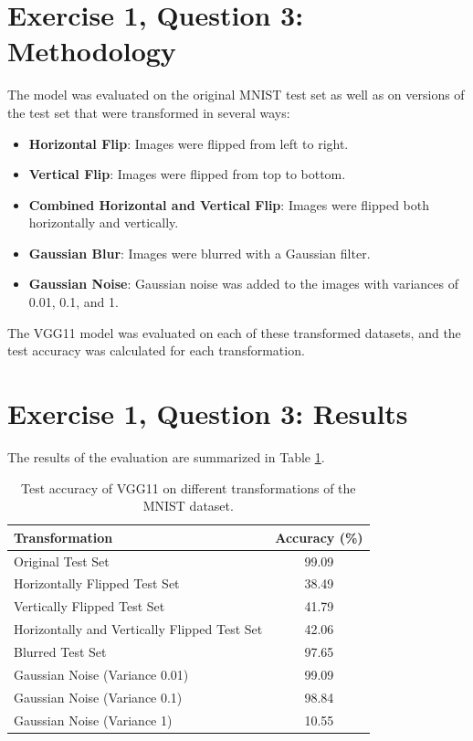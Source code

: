\documentclass[10pt,letter,notitlepage]{article}
\begin{document}
\begin{center}
\section{Exercise 1, Question 3: Methodology}
The model was evaluated on the original MNIST test set as well as on versions of the test set that were transformed in several ways:
\begin{itemize}
    \item \textbf{Horizontal Flip}: Images were flipped from left to right.
    \item \textbf{Vertical Flip}: Images were flipped from top to bottom.
    \item \textbf{Combined Horizontal and Vertical Flip}: Images were flipped both horizontally and vertically.
    \item \textbf{Gaussian Blur}: Images were blurred with a Gaussian filter.
    \item \textbf{Gaussian Noise}: Gaussian noise was added to the images with variances of 0.01, 0.1, and 1.
\end{itemize}
The VGG11 model was evaluated on each of these transformed datasets, and the test accuracy was calculated for each transformation.

\section{Exercise 1, Question 3: Results}
The results of the evaluation are summarized in Table \ref{tab:results}.

\begin{table}[H]
    \centering
    \begin{tabular}{|l|c|}
        \hline
        \textbf{Transformation} & \textbf{Accuracy (\%)} \\
        \hline
        Original Test Set & 99.09 \\
        Horizontally Flipped Test Set & 38.49 \\
        Vertically Flipped Test Set & 41.79 \\
        Horizontally and Vertically Flipped Test Set & 42.06 \\
        Blurred Test Set & 97.65 \\
        Gaussian Noise (Variance 0.01) & 99.09 \\
        Gaussian Noise (Variance 0.1) & 98.84 \\
        Gaussian Noise (Variance 1) & 10.55 \\
        \hline
    \end{tabular}
    \caption{Test accuracy of VGG11 on different transformations of the MNIST dataset.}
    \label{tab:results}
\end{table}


\end{center}
\end{document}
